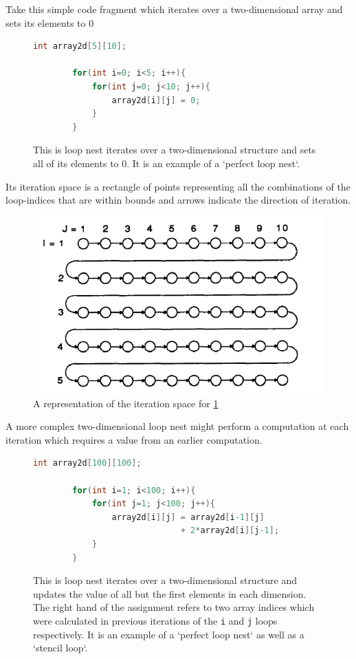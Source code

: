 \documentclass[a4paper,12pt,twoside]{report}
\begin{document}
Take this simple code fragment which iterates over a two-dimensional array and sets its elements to 0
\begin{figure}[h]
    \begin{lstlisting}[language=C]
        int array2d[5][10];

        for(int i=0; i<5; i++){
            for(int j=0; j<10; j++){
                array2d[i][j] = 0;
            }
        }
    \end{lstlisting}
        \caption{
            This is loop nest iterates over a two-dimensional structure and sets all of its elements to 0. It is an example
            of a `perfect loop nest`.
        }
        \label{fig:2dloop}
\end{figure}

Its iteration space is a rectangle of points representing all the combinations of the loop-indices that are within bounds and
arrows indicate the direction of iteration.

\begin{figure}[h]
    \centering
    \includegraphics[scale=0.75]{iteration_space}
    \caption{A representation of the iteration space for \ref{fig:2dloop}}
    \label{fig:iteration_space}
\end{figure}

A more complex two-dimensional loop nest might perform a computation at each iteration which requires a value from an earlier
computation.

\begin{figure}[h]
    \begin{lstlisting}[language=C]
        int array2d[100][100];

        for(int i=1; i<100; i++){
            for(int j=1; j<100; j++){
                array2d[i][j] = array2d[i-1][j] 
                              + 2*array2d[i][j-1];
            }
        }
    \end{lstlisting}
    \caption{
        This is loop nest iterates over a two-dimensional structure and updates the value of all but the first elements in each dimension.
        The right hand of the assignment refers to two array indices which were calculated in previous iterations of the \texttt{i} and \texttt{j} loops
        respectively. It is an example of a `perfect loop nest` as well as a `stencil loop`.
    }
    \label{fig:stencil}
\end{figure}
\end{document}
